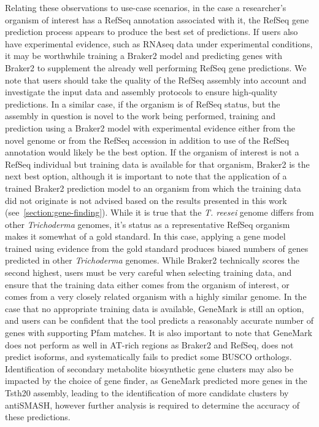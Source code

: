 Relating these observations to use-case scenarios, in the case a researcher's organism of interest has a RefSeq annotation associated with it,
the RefSeq gene prediction process appears to produce the best set of
predictions. If users also have experimental evidence, such as RNAseq
data under experimental conditions, it may be worthwhile training a
Braker2 model and predicting genes with Braker2 to supplement the
already well performing RefSeq gene predictions. We note that users should take the quality of the RefSeq assembly into account and investigate the input data and assembly protocols to ensure high-quality predictions. In a similar case, if
the organism is of RefSeq status, but the assembly in question is
novel to the work being performed, training and prediction using a
Braker2 model with experimental evidence either from the novel genome
or from the RefSeq accession in addition to use of the RefSeq
annotation would likely be the best option. If the organism of
interest is not a RefSeq individual but training data is available for
that organism, Braker2 is the next best option, although it is
important to note that the application of a trained Braker2 prediction
model to an organism from which the training data did not originate is
not advised based on the results presented in this work (see~\ref{section:gene-finding}). While it is true that the
\textit{T. reesei} genome differs from other \textit{Trichoderma}
genomes, it's status as a representative RefSeq organism makes it
somewhat of a gold standard. In this case, applying a gene model
trained using evidence from the gold standard produces biased numbers
of genes predicted in other \textit{Trichoderma} genomes. While
Braker2 technically scores the second highest, users must be very
careful when selecting training data, and ensure that the training
data either comes from the organism of interest, or comes from a very
closely related organism with a highly similar genome. In the case
that no appropriate training data is available, GeneMark is still an
option, and users can be confident that the tool predicts a reasonably
accurate number of genes with supporting Pfam matches. It is also
important to note that GeneMark does not perform as well in AT-rich
regions as Braker2 and RefSeq, does not predict isoforms, and
systematically fails to predict some BUSCO orthologs. Identification of secondary metabolite biosynthetic gene clusters may also be impacted by the choice of gene finder, as GeneMark predicted more genes in the Tsth20 assembly, leading to the identification of more candidate clusters by antiSMASH, however further analysis is required to determine the accuracy of these predictions.

